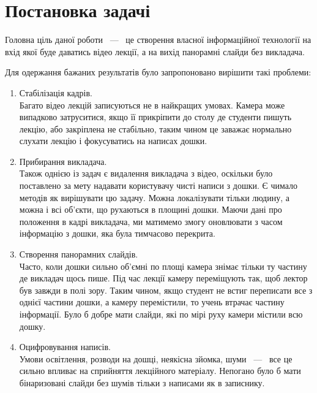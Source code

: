 \section{Постановка задачі}

Головна ціль даної роботи ~---~ це створення власної інформаційної технології
на вхід якої буде даватись відео лекції, а на вихід панорамні слайди
без викладача.

Для одержання бажаних результатів було запропоновано
вирішити такі проблеми:
\begin{enumerate}
	\item
	      Стабілізація кадрів.\\
	      Багато відео лекцій записуються не в найкращих умовах.
	      Камера може випадково затруситися, якщо її прикріпити до столу
	      де студенти пишуть лекцію, або закріплена не стабільно, таким чином
	      це заважає нормально слухати лекцію і фокусуватись на написах дошки.

	\item
	      Прибирання викладача.\\
	      Також однією із задач є видалення викладача з відео, оскільки
	      було поставлено за мету надавати користувачу чисті написи з дошки.
	      Є чимало методів як вирішувати цю задачу. Можна локалізувати тільки
	      людину, а можна і всі об'єкти, що рухаються в площині дошки. Маючи
	      дані про положення в кадрі викладача, ми матимемо змогу оновлювати
	      з часом інформацію з дошки, яка була тимчасово перекрита.

	\item
	      Створення панорамних слайдів.\\
	      Часто, коли дошки сильно об'ємні по площі камера знімає тільки ту частину де
	      викладач щось пише. Під час лекції камеру переміщують так, щоб лектор був завжди
	      в полі зору. Таким чином, якщо студент не встиг переписати все з однієї частини
	      дошки, а камеру перемістили, то учень втрачає частину інформації. Було б добре
	      мати слайди, які по мірі руху камери містили всю дошку.

	\item
	      Оцифровування написів. \\
	      Умови освітлення, розводи на дошці, неякісна зйомка, шуми ~---~ все це сильно впливає
	      на сприйняття лекційного матеріалу. Непогано було б мати бінаризовані слайди без
	      шумів тільки з написами як в записнику.

\end{enumerate}


